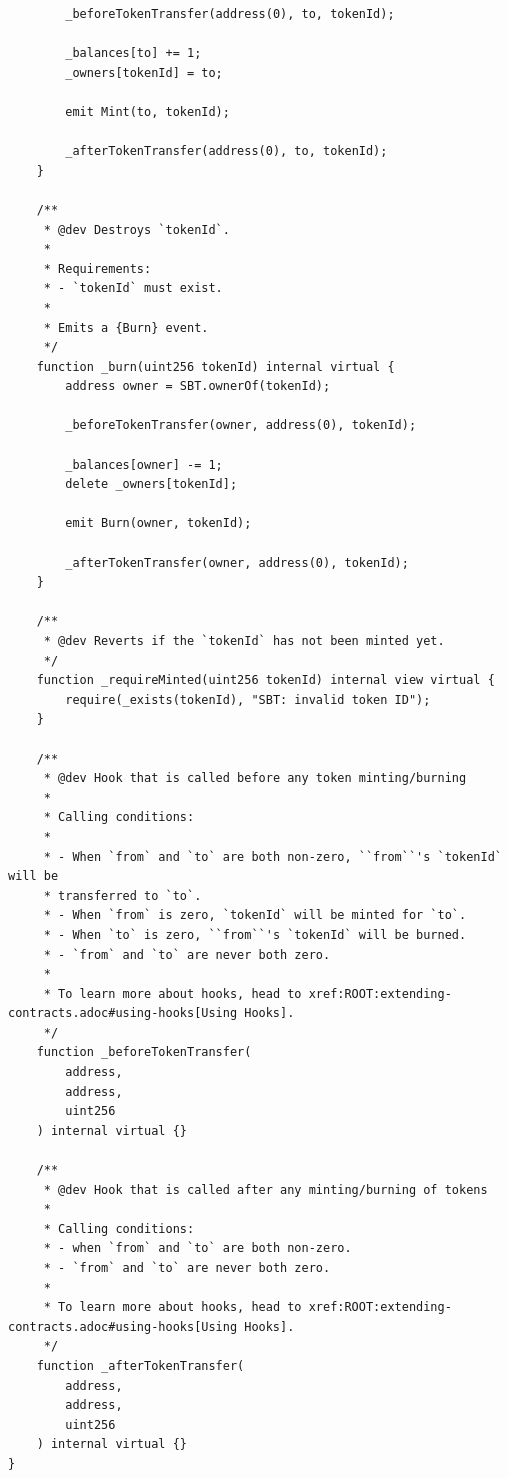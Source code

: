 \documentclass{article}
\begin{document}
\begin{verbatim}
        _beforeTokenTransfer(address(0), to, tokenId);

        _balances[to] += 1;
        _owners[tokenId] = to;

        emit Mint(to, tokenId);

        _afterTokenTransfer(address(0), to, tokenId);
    }

    /**
     * @dev Destroys `tokenId`.
     *
     * Requirements:
     * - `tokenId` must exist.
     *
     * Emits a {Burn} event.
     */
    function _burn(uint256 tokenId) internal virtual {
        address owner = SBT.ownerOf(tokenId);

        _beforeTokenTransfer(owner, address(0), tokenId);

        _balances[owner] -= 1;
        delete _owners[tokenId];

        emit Burn(owner, tokenId);

        _afterTokenTransfer(owner, address(0), tokenId);
    }

    /**
     * @dev Reverts if the `tokenId` has not been minted yet.
     */
    function _requireMinted(uint256 tokenId) internal view virtual {
        require(_exists(tokenId), "SBT: invalid token ID");
    }

    /**
     * @dev Hook that is called before any token minting/burning
     *
     * Calling conditions:
     *
     * - When `from` and `to` are both non-zero, ``from``'s `tokenId` will be
     * transferred to `to`.
     * - When `from` is zero, `tokenId` will be minted for `to`.
     * - When `to` is zero, ``from``'s `tokenId` will be burned.
     * - `from` and `to` are never both zero.
     *
     * To learn more about hooks, head to xref:ROOT:extending-contracts.adoc#using-hooks[Using Hooks].
     */
    function _beforeTokenTransfer(
        address,
        address,
        uint256
    ) internal virtual {}

    /**
     * @dev Hook that is called after any minting/burning of tokens
     *
     * Calling conditions:
     * - when `from` and `to` are both non-zero.
     * - `from` and `to` are never both zero.
     *
     * To learn more about hooks, head to xref:ROOT:extending-contracts.adoc#using-hooks[Using Hooks].
     */
    function _afterTokenTransfer(
        address,
        address,
        uint256
    ) internal virtual {}
}
\end{verbatim}



\end{document}
